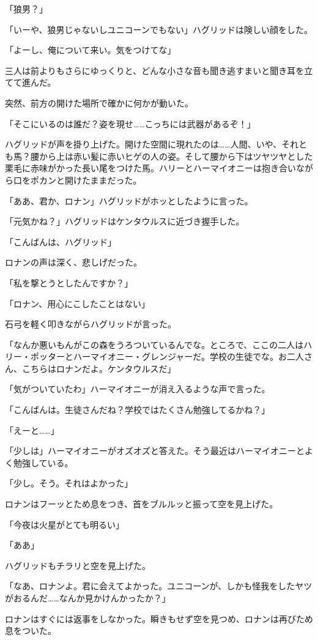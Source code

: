 \documentclass[10pt,a4paper]{article}
\begin{document}
\begin{CJK}{UTF8}{min}
「狼男？」

「いーや、狼男じゃないしユニコーンでもない」ハグリッドは険しい顔をした。

「よーし、俺について来い。気をつけてな」

三人は前よりもさらにゆっくりと、どんな小さな音も聞き逃すまいと聞き耳を立てて進んだ。

突然、前方の開けた場所で確かに何かが動いた。

「そこにいるのは誰だ？姿を現せ……こっちには武器があるぞ！」

ハグリッドが声を掛り上げた。開けた空間に現れたのは……人間、いや、それとも馬？腰から上は赤い髪に赤いヒゲの人の姿。そして腰から下はツヤツヤとした栗毛に赤味がかった長い尾をつけた馬。ハリーとハーマイオニーは抱き合いながら口をポカンと開けたままだった。

「ああ、君か、ロナン」ハグリッドがホッとしたように言った。

「元気かね？」ハグリッドはケンタウルスに近づき握手した。

「こんばんは、ハグリッド」

ロナンの声は深く、悲しげだった。

「私を撃とうとしたんですか？」

「ロナン、用心にこしたことはない」

石弓を軽く叩きながらハグリッドが言った。

「なんか悪いもんがこの森をうろついているんでな。ところで、ここの二人はハリー・ポッターとハーマイオニー・グレンジャーだ。学校の生徒でな。お二人さん、こちらはロナンだよ。ケンタウルスだ」

「気がついていたわ」ハーマイオニーが消え入るような声で言った。

「こんばんは。生徒さんだね？学校ではたくさん勉強してるかね？」

「えーと……」

「少しは」ハーマイオニーがオズオズと答えた。そう最近はハーマイオニーとよく勉強している。

「少し。そう。それはよかった」

ロナンはフーッとため息をつき、首をブルルッと振って空を見上げた。

「今夜は火星がとても明るい」

「ああ」

ハグリッドもチラリと空を見上げた。

「なあ、ロナンよ。君に会えてよかった。ユニコーンが、しかも怪我をしたヤツがおるんだ……なんか見かけんかったか？」

ロナンはすぐには返事をしなかった。瞬きもせず空を見つめ、ロナンは再びため息をついた。


\end{CJK}
\end{document}
